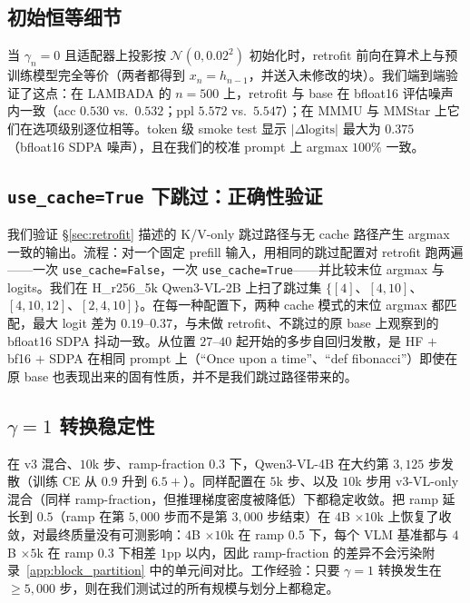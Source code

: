 \documentclass{article}
\begin{document}
\subsection{初始恒等细节}
\label{app:identity}
当 $\gamma_n{=}0$ 且适配器上投影按 $\mathcal{N}(0, 0.02^2)$ 初始化时，retrofit 前向在算术上与预训练模型完全等价（两者都得到 $x_n = h_{n-1}$，并送入未修改的块）。我们端到端验证了这点：在 LAMBADA 的 $n{=}500$ 上，retrofit 与 base 在 bfloat16 评估噪声内一致（acc $0.530$ vs.\ $0.532$；ppl $5.572$ vs.\ $5.547$）；在 MMMU 与 MMStar 上它们在选项级别逐位相等。token 级 smoke test 显示 $|\Delta\text{logits}|$ 最大为 $0.375$（bfloat16 SDPA 噪声），且在我们的校准 prompt 上 argmax $100\%$ 一致。

\subsection{\texorpdfstring{\texttt{use\_cache=True} 下跳过：正确性验证}{Skip under use cache: correctness verification}}
\label{app:kv_equiv}
我们验证 \S\ref{sec:retrofit} 描述的 K/V-only 跳过路径与无 cache 路径产生 argmax 一致的输出。流程：对一个固定 prefill 输入，用相同的跳过配置对 retrofit 跑两遍——一次 \texttt{use\_cache=False}，一次 \texttt{use\_cache=True}——并比较末位 argmax 与 logits。我们在 H\_r256\_5k Qwen3-VL-2B 上扫了跳过集 $\{[4]$、$[4,10]$、$[4,10,12]$、$[2,4,10]\}$。在每一种配置下，两种 cache 模式的末位 argmax 都匹配，最大 logit 差为 $0.19$--$0.37$，与未做 retrofit、不跳过的原 base 上观察到的 bfloat16 SDPA 抖动一致。从位置 $27$--$40$ 起开始的多步自回归发散，是 HF $+$ bf16 $+$ SDPA 在相同 prompt 上（``Once upon a time''、``def fibonacci''）即使在原 base 也表现出来的固有性质，并不是我们跳过路径带来的。

\subsection{\texorpdfstring{$\gamma{=}1$ 转换稳定性}{gamma=1 transition stability}}
\label{app:gamma_stability}
在 v3 混合、$10$k 步、ramp-fraction $0.3$ 下，Qwen3-VL-4B 在大约第 $3{,}125$ 步发散（训练 CE 从 $0.9$ 升到 $6.5+$）。同样配置在 $5$k 步、以及 $10$k 步用 v3-VL-only 混合（同样 ramp-fraction，但推理梯度密度被降低）下都稳定收敛。把 ramp 延长到 $0.5$（ramp 在第 $5{,}000$ 步而不是第 $3{,}000$ 步结束）在 $4$B $\times 10$k 上恢复了收敛，对最终质量没有可测影响：$4$B $\times 10$k 在 ramp $0.5$ 下，每个 VLM 基准都与 $4$B $\times 5$k 在 ramp $0.3$ 下相差 $1$pp 以内，因此 ramp-fraction 的差异不会污染附录~\ref{app:block_partition} 中的单元间对比。工作经验：只要 $\gamma{=}1$ 转换发生在 $\geq 5{,}000$ 步，则在我们测试过的所有规模与划分上都稳定。
\end{document}
